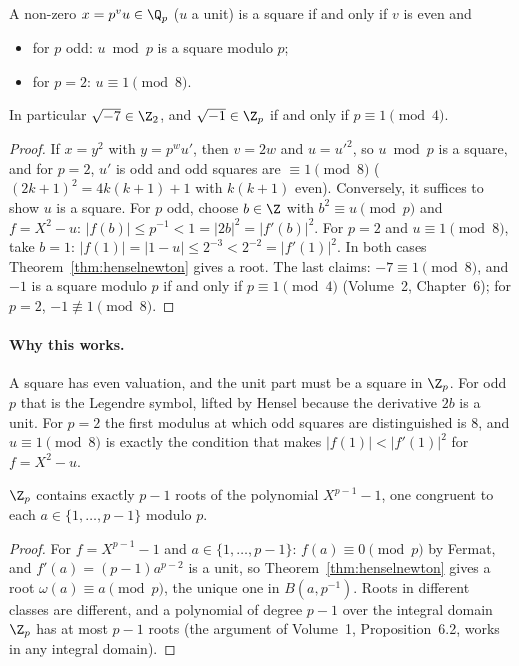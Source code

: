 \begin{corollary}[squares in $\Q_p$]\label{cor:squares}
A non-zero $x=p^vu\in\Q_p$ ($u$ a unit) is a square if and only if $v$ is even and
\begin{itemize}
\item for $p$ odd: $u\bmod p$ is a square modulo $p$;
\item for $p=2$: $u\equiv1\pmod8$.
\end{itemize}
In particular $\sqrt{-7}\in\Z_2$, and $\sqrt{-1}\in\Z_p$ if and only if $p\equiv1\pmod4$.
\end{corollary}
\begin{proof}
If $x=y^2$ with $y=p^wu'$, then $v=2w$ and $u=u'^2$, so $u\bmod p$ is a square, and for $p=2$, $u'$ is odd and odd squares are $\equiv1\pmod8$ ($(2k+1)^2=4k(k+1)+1$ with $k(k+1)$ even). Conversely, it suffices to show $u$ is a square. For $p$ odd, choose $b\in\Z$ with $b^2\equiv u\pmod p$ and $f=X^2-u$: $|f(b)|\le p^{-1}<1=|2b|^2=|f'(b)|^2$. For $p=2$ and $u\equiv1\pmod 8$, take $b=1$: $|f(1)|=|1-u|\le2^{-3}<2^{-2}=|f'(1)|^2$. In both cases Theorem~\ref{thm:henselnewton} gives a root. The last claims: $-7\equiv1\pmod8$, and $-1$ is a square modulo $p$ if and only if $p\equiv1\pmod4$ (Volume~2, Chapter~6); for $p=2$, $-1\not\equiv1\pmod8$.
\end{proof}

\paragraph{Why this works.}
A square has even valuation, and the unit part must be a square in $\Z_p$. For odd $p$ that is the Legendre symbol, lifted by Hensel because the derivative $2b$ is a unit. For $p=2$ the first modulus at which odd squares are distinguished is $8$, and $u\equiv 1\pmod 8$ is exactly the condition that makes $|f(1)|<|f'(1)|^2$ for $f=X^2-u$.

\begin{corollary}\label{cor:teich}
$\Z_p$ contains exactly $p-1$ roots of the polynomial $X^{p-1}-1$, one congruent to each $a\in\{1,\dots,p-1\}$ modulo $p$.
\end{corollary}
\begin{proof}
For $f=X^{p-1}-1$ and $a\in\{1,\dots,p-1\}$: $f(a)\equiv0\pmod p$ by Fermat, and $f'(a)=(p-1)a^{p-2}$ is a unit, so Theorem~\ref{thm:henselnewton} gives a root $\omega(a)\equiv a\pmod p$, the unique one in $B(a,p^{-1})$. Roots in different classes are different, and a polynomial of degree $p-1$ over the integral domain $\Z_p$ has at most $p-1$ roots (the argument of Volume~1, Proposition~6.2, works in any integral domain).
\end{proof}

